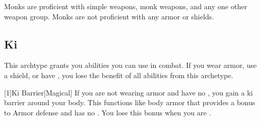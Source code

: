         Monks are proficient with simple weapons, monk weapons, and any one other weapon group.
        Monks are not proficient with any armor or shields.

    \subsection{Ki}
        This archtype grants you abilities you can use in combat.
        If you wear armor, use a shield, or have , you lose the benefit of all abilities from this archetype.

        [1]{Ki Barrier}[Magical]
        If you are not wearing armor and have no , you gain a ki barrier around your body.
        This functions like body armor that provides a  bonus to Armor defense and has no .
        You lose this bonus when you are \helpless.

